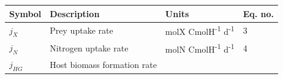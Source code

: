 \documentclass[]{elsarticle} %
\begin{document}
\begin{longtable}[c]{@{}llll@{}}
\toprule
\begin{minipage}[b]{0.10\columnwidth}\raggedright\strut
Symbol
\strut\end{minipage} &
\begin{minipage}[b]{0.48\columnwidth}\raggedright\strut
Description
\strut\end{minipage} &
\begin{minipage}[b]{0.25\columnwidth}\raggedright\strut
Units
\strut\end{minipage} &
\begin{minipage}[b]{0.10\columnwidth}\raggedright\strut
Eq. no.
\strut\end{minipage}\tabularnewline
\midrule
\endhead
\begin{minipage}[t]{0.10\columnwidth}\raggedright\strut
\(j_X\)
\strut\end{minipage} &
\begin{minipage}[t]{0.48\columnwidth}\raggedright\strut
Prey uptake rate
\strut\end{minipage} &
\begin{minipage}[t]{0.25\columnwidth}\raggedright\strut
molX CmolH\textsuperscript{-1} d\textsuperscript{-1}
\strut\end{minipage} &
\begin{minipage}[t]{0.10\columnwidth}\raggedright\strut
3
\strut\end{minipage}\tabularnewline
\begin{minipage}[t]{0.10\columnwidth}\raggedright\strut
\(j_N\)
\strut\end{minipage} &
\begin{minipage}[t]{0.48\columnwidth}\raggedright\strut
Nitrogen uptake rate
\strut\end{minipage} &
\begin{minipage}[t]{0.25\columnwidth}\raggedright\strut
molN CmolH\textsuperscript{-1} d\textsuperscript{-1}
\strut\end{minipage} &
\begin{minipage}[t]{0.10\columnwidth}\raggedright\strut
4
\strut\end{minipage}\tabularnewline
\begin{minipage}[t]{0.10\columnwidth}\raggedright\strut
\(j_{HG}\)
\strut\end{minipage} &
\begin{minipage}[t]{0.48\columnwidth}\raggedright\strut
Host biomass formation rate
\strut\end{minipage} &

\end{longtable}
\end{document}

